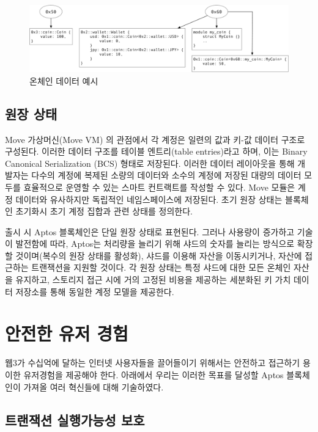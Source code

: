 \documentclass{article}
\begin{document}
\begin{figure}
\centering
\includegraphics[width=1.0\textwidth]{move_2.pdf}
\caption{\label{fig:move_data}온체인 데이터 예시}
\end{figure}

\subsection{원장 상태}
\label{sub:ledger_state}

Move 가상머신(Move VM) 의 관점에서 각 계정은 일련의 값과 키-값 데이터 구조로 구성된다. 이러한 데이터 구조를 테이블 엔트리(table entries)라고 하며, 이는 Binary Canonical Serialization (BCS) 형태로 저장된다. 이러한 데이터 레이아웃을 통해 개발자는 다수의 계정에 복제된 소량의 데이터와 소수의 계정에 저장된 대량의 데이터 모두를 효율적으로 운영할 수 있는 스마트 컨트랙트를 작성할 수 있다. Move 모듈은 계정 데이터와 유사하지만 독립적인 네임스페이스에 저장된다. 초기 원장 상태는 블록체인 초기화시 초기 계정 집합과 관련 상태를 정의한다.

출시 시 Aptos 블록체인은 단일 원장 상태로 표현된다. 그러나 사용량이 증가하고 기술이 발전함에 따라, Aptos는 처리량을 늘리기 위해 샤드의 숫자를 늘리는 방식으로 확장할 것이며(복수의 원장 상태를 활성화), 샤드를 이용해 자산을 이동시키거나, 자산에 접근하는 트랜잭션을 지원할 것이다. 각 원장 상태는 특정 샤드에 대한 모든 온체인 자산을 유지하고, 스토리지 접근 시에 거의 고정된 비용을 제공하는 세분화된 키 가치 데이터 저장소를 통해 동일한 계정 모델을 제공한다.

\section{안전한 유저 경험}
\label{sec:user}

웹3가 수십억에 달하는 인터넷 사용자들을 끌어들이기 위해서는 안전하고 접근하기 용이한 유저경험을 제공해야 한다. 아래에서 우리는 이러한 목표를 달성할 Aptos 블록체인이 가져올 여러 혁신들에 대해 기술하였다.

\subsection{트랜잭션 실행가능성 보호}
\label{subsec:transaction_replay_protection}
\end{document}
